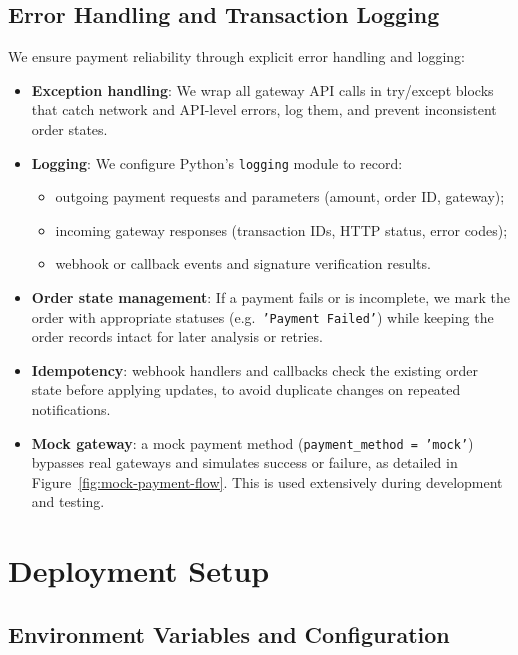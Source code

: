 \subsection{Error Handling and Transaction Logging}

We ensure payment reliability through explicit error handling and logging:

\begin{itemize}
  \item \textbf{Exception handling}: We wrap all gateway API calls in try/except blocks that catch network and API-level errors, log them, and prevent inconsistent order states.
  \item \textbf{Logging}: We configure Python’s \texttt{logging} module to record:
  \begin{itemize}
    \item outgoing payment requests and parameters (amount, order ID, gateway);
    \item incoming gateway responses (transaction IDs, HTTP status, error codes);
    \item webhook or callback events and signature verification results.
  \end{itemize}
  \item \textbf{Order state management}: If a payment fails or is incomplete, we mark the order with appropriate statuses (e.g.\ \texttt{'Payment Failed'}) while keeping the order records intact for later analysis or retries.

  \item \textbf{Idempotency}: webhook handlers and callbacks check the existing order state before applying updates, to avoid duplicate changes on repeated notifications.
  \item \textbf{Mock gateway}: a mock payment method (\texttt{payment\_method = 'mock'}) bypasses real gateways and simulates success or failure, as detailed in Figure~\ref{fig:mock-payment-flow}. This is used extensively during development and testing.
\end{itemize}

\section{Deployment Setup}

\subsection{Environment Variables and Configuration}

